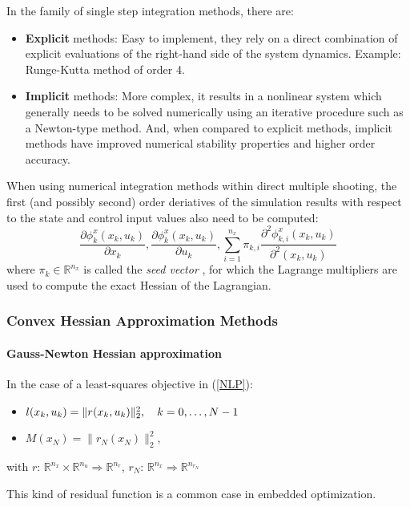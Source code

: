 \documentclass{thesisreport}
\begin{document}
In the family of single step integration methods, there are: 
    \begin{itemize}
        \item \textbf{Explicit} methods: Easy to implement, they rely on a direct combination of explicit evaluations of the right-hand side of the system dynamics. Example: Runge-Kutta method of order 4.
        \item \textbf{Implicit} methods: More complex, it results in a nonlinear system which generally needs to be solved numerically using an iterative procedure such as a Newton-type method. And, when compared to explicit methods, implicit methods have improved numerical stability properties and higher order accuracy.
    \end{itemize}


When using numerical integration methods within direct multiple shooting, the first (and possibly second) order deriatives of the simulation
results with respect to the state and control input values also need to be computed:
    $$ \frac{\partial \phi_k^x (x_k, u_k)}{\partial x_k}, \frac{\partial \phi_k^x (x_k, u_k)}{\partial u_k}, \sum_{i=1}^{n_x} \pi_{k,i} \frac{\partial^2 \phi_{k,i}^x (x_k, u_k)}{\partial^2 (x_k, u_k)} $$
    where $\pi_k \in \mathbb{R}^{n_x}$ is called the \textit{seed vector} \cite{acados2019}, for which the Lagrange multipliers are used to compute the exact Hessian of the Lagrangian.

\subsubsection{Convex Hessian Approximation Methods}

    \paragraph{Gauss-Newton Hessian approximation} In the case of a least-squares objective in (\ref{NLP}):
    \begin{itemize}
        \item $l(x_k, u_k) = \|r(x_k, u_k) \|_2^2, \text{\space \space \space} k=0, \ldots, N-1$
        \item $M(x_N) = \|r_N (x_N)\|_2^2$,
    \end{itemize}
    with $r$: $\mathbb{R}^{n_x} \times \mathbb{R}^{n_u} \Rightarrow \mathbb{R}^{n_r}$, $r_N$: $\mathbb{R}^{n_x} \Rightarrow \mathbb{R}^{n_{r_N}}$

This kind of residual function is a common case in embedded optimization.
\end{document}
